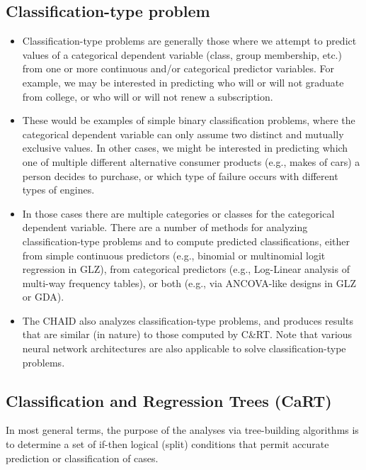 \documentclass[caret-main.tex]{subfiles}
\begin{document}
\subsection{Classification-type problem}
\begin{itemize}
\item Classification-type problems are generally those where we attempt to predict values of a categorical dependent variable (class, group membership, etc.) from one or more continuous and/or categorical predictor variables. For example, we may be interested in predicting who will or will not graduate from college, or who will or will not renew a subscription. 
\item These would be examples of simple binary classification problems, where the categorical dependent variable can only assume two distinct and mutually exclusive values. In other cases, we might be interested in predicting which one of multiple different alternative consumer products (e.g., makes of cars) a person decides to purchase, or which type of failure occurs with different types of engines. 
\item In those cases there are multiple categories or classes for the categorical dependent variable. There are a number of methods for analyzing classification-type problems and to compute predicted classifications, either from simple continuous predictors (e.g., binomial or multinomial logit regression in GLZ), from categorical predictors (e.g., Log-Linear analysis of multi-way frequency tables), or both (e.g., via ANCOVA-like designs in GLZ or GDA). 
\item The CHAID also analyzes classification-type problems, and produces results that are similar (in nature) to those computed by C\&RT. Note that various neural network architectures are also applicable to solve classification-type problems.
\end{itemize}
\subsection{Classification and Regression Trees (CaRT)}

In most general terms, the purpose of the analyses via tree-building algorithms is to determine a set of if-then logical (split) conditions that permit accurate prediction or classification of cases.
\end{document}
